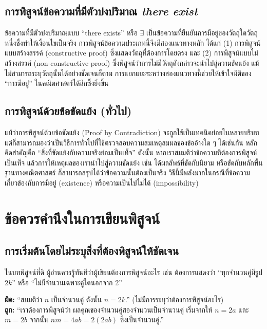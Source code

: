 \subsection{การพิสูจน์ข้อความที่มีตัวบ่งปริมาณ \textit{there exist}}
ข้อความที่มีตัวบ่งปริมาณแบบ “there exists” หรือ $\exists$ เป็นข้อความที่ยืนยันการมีอยู่ของวัตถุใดวัตถุหนึ่งซึ่งทำให้เงื่อนไขเป็นจริง การพิสูจน์ข้อความประเภทนี้จึงมีสองแนวทางหลัก ได้แก่ (1) การพิสูจน์แบบสร้างสรรค์ (constructive proof) ซึ่งแสดงวัตถุที่ต้องการโดยตรง และ (2) การพิสูจน์แบบไม่สร้างสรรค์ (non-constructive proof) ซึ่งพิสูจน์ว่าการไม่มีวัตถุดังกล่าวจะนำไปสู่ความขัดแย้ง แม้ไม่สามารถระบุวัตถุนั้นได้อย่างชัดเจนก็ตาม การแยกแยะระหว่างสองแนวทางนี้ช่วยให้เข้าใจมิติของ “การมีอยู่” ในคณิตศาสตร์ได้ลึกซึ้งยิ่งขึ้น

\subsection{การพิสูจน์ด้วยข้อขัดแย้ง (ทั่วไป)}
แม้ว่าการพิสูจน์ด้วยข้อขัดแย้ง (Proof by Contradiction) จะถูกใช้เป็นเทคนิคย่อยในหลายบริบท แต่ก็สามารถมองว่าเป็นวิธีการทั่วไปที่ใช้ตรวจสอบความสมเหตุสมผลของข้ออ้างใด ๆ ได้เช่นกัน หลักคิดสำคัญคือ “สิ่งที่ขัดแย้งกับความจริงย่อมเป็นเท็จ” ดังนั้น หากเราสมมติว่าข้อความที่ต้องการพิสูจน์เป็นเท็จ แล้วการให้เหตุผลของเรานำไปสู่ความขัดแย้ง เช่น ได้ผลลัพธ์ที่ขัดกับนิยาม หรือขัดกับหลักพื้นฐานทางคณิตศาสตร์ ก็สามารถสรุปได้ว่าข้อความนั้นต้องเป็นจริง วิธีนี้มีพลังมากในกรณีที่ข้อความเกี่ยวข้องกับการมีอยู่ (existence) หรือความเป็นไปไม่ได้ (impossibility)



\section{ข้อควรคำนึงในการเขียนพิสูจน์}

\subsection*{การเริ่มต้นโดยไม่ระบุสิ่งที่ต้องพิสูจน์ให้ชัดเจน}
ในบทพิสูจน์ที่ดี ผู้อ่านควรรู้ทันทีว่าผู้เขียนต้องการพิสูจน์อะไร เช่น ต้องการแสดงว่า “ทุกจำนวนคู่มีรูป $2k$” หรือ “ไม่มีจำนวนเฉพาะคู่ใดนอกจาก 2”  
\begin{exam}
	\textbf{ผิด:} “สมมติว่า $n$ เป็นจำนวนคู่ ดังนั้น $n = 2k$.” (ไม่มีการระบุว่าต้องการพิสูจน์อะไร)\\
	\textbf{ถูก:} “เราต้องการพิสูจน์ว่า ผลคูณของจำนวนคู่สองจำนวนเป็นจำนวนคู่ เริ่มจากให้ $n=2a$ และ $m=2b$ จากนั้น $nm = 4ab = 2(2ab)$ ซึ่งเป็นจำนวนคู่.”
\end{exam}


